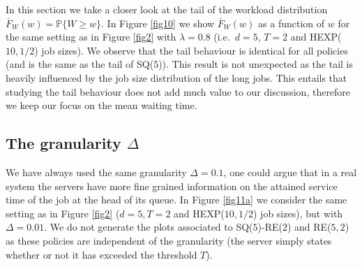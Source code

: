 \documentclass[12pt]{report}
\begin{document}
In this section we take a closer look at the tail of the workload distribution $\bar F_W(w) = \mathbb{P}\{W \geq w\}$. In Figure \ref{fig10} we show $\bar F_W(w)$ as a function of $w$ for the same setting as in Figure \ref{fig2} with $\lambda = 0.8$ (i.e.~$d=5$, $T=2$ and HEXP($10,1/2$) job sizes). We observe that the tail behaviour is identical for all policies (and is the same as the tail of SQ($5$)). This result is not unexpected as the tail is heavily influenced by the
job size distribution of the long jobs.
This entails that studying the tail behaviour does not add much value to our discussion, therefore we keep our focus on the mean waiting time.
\subsection{The granularity $\Delta$}
We have always used the same granularity $\Delta=0.1$, one could argue that in a real system the servers have more fine grained information on the attained service time of the job at the head of its queue. In Figure \ref{fig11a} we consider the same setting as in Figure \ref{fig2} ($d=5, T=2$ and HEXP($10,1/2$) job sizes), but with $\Delta=0.01$. We do not generate the plots associated to SQ($5$)-RE($2$) and RE($5, 2$) as these policies are independent of the granularity (the server simply states whether or not it has exceeded the threshold $T$). 
\end{document}
